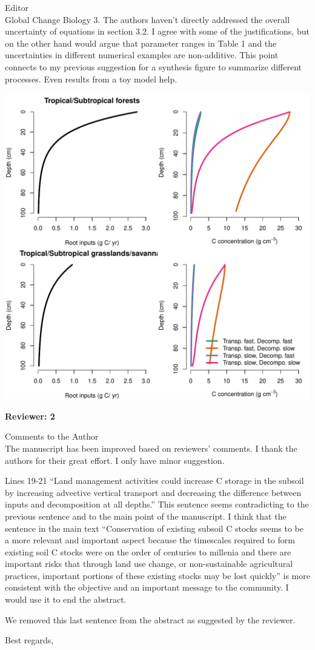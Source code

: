 \documentclass[11pt]{bgcletter}
\newcommand{\answer}[1] {
{\color{cyan} #1}
}
\begin{document}
\begin{letter}{Editor\\
   Global Change Biology
}
3. The authors haven't directly addressed the overall uncertainty of equations in section 3.2. I agree with some of the justifications, but on the other hand would argue that parameter ranges in Table 1 and the uncertainties in different numerical examples are non-additive. This point connects to my previous suggestion for a synthesis figure to summarize different processes. Even results from a toy model help.

\includegraphics[scale=0.5]{exampleFig.pdf}

\newpage

\textbf{Reviewer: 2}

Comments to the Author \\
The manuscript has been improved based on reviewers’ comments. I thank the authors for their great effort. I only have minor suggestion.

Lines 19-21 “Land management activities could increase C storage in the subsoil by increasing advective vertical transport and decreasing the difference between inputs and decomposition at all depths.” This sentence seems contradicting to the previous sentence and to the main point of the manuscript. I think that the sentence in the main text “Conservation of existing subsoil C stocks seems to be a more relevant and important aspect because the timescales required to form existing soil C stocks were on the order of centuries to millenia and there are important risks that through land use change, or non-sustainable agricultural practices, important portions of these existing stocks may be lost quickly” is more consistent with the objective and an important message to the community. I would use it to end the abstract.

\answer{We removed this last sentence from the abstract as suggested by the reviewer.}

 \closing{Best regards,} 
 \end{letter}

 
\end{document}
